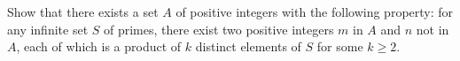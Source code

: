 Show that there exists a set $ A$ of positive integers with the following property: for any infinite set $ S$ of primes, there exist two positive integers $ m$ in $ A$ and $ n$ not in $ A$,  each of which is a product of $ k$ distinct elements of $ S$ for some $ k \geq 2$.
